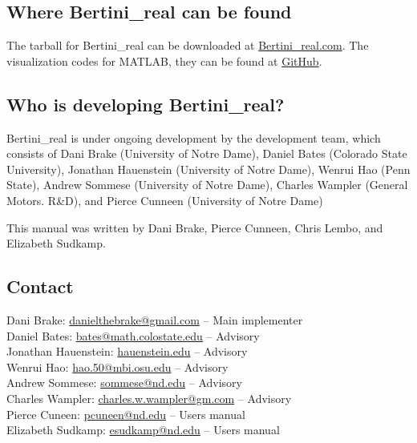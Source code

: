 \subsection{Where Bertini\_real can be found}
		
	The tarball for Bertini\_real can be downloaded at \href{http://www.bertinireal.com/download.html}{Bertini\_real.com}. 
	The visualization codes for MATLAB, they can be found at \href{https://github.com/ofloveandhate/bertini_real/tree/master/matlab_codes}{GitHub}.


	\subsection{Who is developing Bertini\_real?}
	Bertini\_real is under ongoing development by the development team, which consists of Dani Brake (University of Notre Dame), Daniel Bates (Colorado State University), Jonathan Hauenstein (University of Notre Dame), Wenrui Hao (Penn State), Andrew Sommese (University of Notre Dame), Charles Wampler (General Motors. R\&D), and Pierce Cunneen (University of Notre Dame)

	This manual was written by Dani Brake, Pierce Cunneen, Chris Lembo, and Elizabeth Sudkamp.


\subsection{Contact}
\label{sec:contact}

Dani Brake: \href{mailto:danielthebrake@gmail.com}{danielthebrake@gmail.com} -- Main implementer\\
Daniel Bates: \href{mailto:bates@math.colostate.edu}{bates@math.colostate.edu} -- Advisory \\
Jonathan Hauenstein: \href{mailto:hauenstein.edu}{hauenstein.edu} -- Advisory\\
Wenrui Hao: \href{mailto:hao.50@mbi.osu.edu}{hao.50@mbi.osu.edu} -- Advisory\\
Andrew Sommese: \href{mailto:sommese@nd.edu}{sommese@nd.edu} -- Advisory\\
Charles Wampler: \href{mailto:charles.w.wampler@gm.com}{charles.w.wampler@gm.com} -- Advisory\\
Pierce Cuneen: \href{mailto:pcuneen@nd.edu}{pcuneen@nd.edu} -- Users manual \\
Elizabeth Sudkamp: \href{mailto:esudkamp@nd.edu}{esudkamp@nd.edu} -- Users manual

